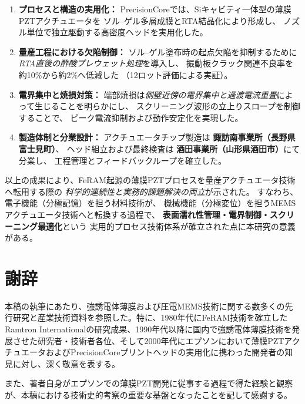 \documentclass[conference]{IEEEtran}
\begin{document}
\begin{enumerate}[label=(\arabic*)]
  \item \textbf{プロセスと構造の実用化：}
  PrecisionCoreでは、Siキャビティ一体型の薄膜PZTアクチュエータを
  ソル–ゲル多層成膜とRTA結晶化により形成し、
  ノズル単位で独立駆動する高密度ヘッドを実用化した\cite{uemura2014mems}。

  \item \textbf{量産工程における欠陥制御：}
  ソル–ゲル塗布時の起点欠陥を抑制するために
  \emph{RTA直後の酢酸プレウェット処理}を導入し、
  振動板クラック関連不良率を約10\%から約2\%へ低減した
  （12ロット評価による実証）。

  \item \textbf{電界集中と焼損対策：}
  端部焼損は\emph{側壁近傍の電界集中と過渡電流重畳}によって生じることを明らかにし、
  スクリーニング波形の立上りスロープを制御することで、
  ピーク電流抑制および動作安定化を実現した。

  \item \textbf{製造体制と分業設計：}
  アクチュエータチップ製造は
  \textbf{諏訪南事業所（長野県富士見町）}、
  ヘッド組立および最終検査は
  \textbf{酒田事業所（山形県酒田市）}にて分業し、
  工程管理とフィードバックループを確立した。
\end{enumerate}

\medskip
以上の成果により、FeRAM起源の薄膜PZTプロセスを量産アクチュエータ技術へ転用する際の
\emph{科学的連続性と実務的課題解決の両立}が示された。
すなわち、電子機能（分極記憶）を担う材料技術が、
機械機能（分極変位）を担うMEMSアクチュエータ技術へと転換する過程で、
\textbf{表面濡れ性管理・電界制御・スクリーニング最適化}という
実用的プロセス技術体系が確立された点に本研究の意義がある。

\section*{謝辞}
本稿の執筆にあたり、強誘電体薄膜および圧電MEMS技術に関する数多くの先行研究と産業技術資料を参照した。特に、1980年代にFeRAM技術を確立したRamtron Internationalの研究成果、1990年代以降に国内で強誘電体薄膜技術を発展させた研究者・技術者各位、そして2000年代にエプソンにおいて薄膜PZTアクチュエータおよびPrecisionCoreプリントヘッドの実用化に携わった開発者の知見に対し、深く敬意を表する。

また、著者自身がエプソンでの薄膜PZT開発に従事する過程で得た経験と観察が、本稿における技術史的考察の重要な基盤となったことを記して感謝する。
\end{document}
